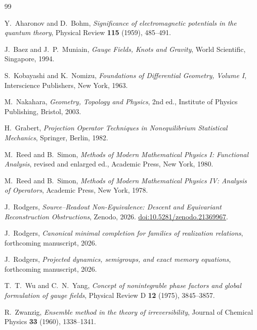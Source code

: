\documentclass[11pt,reqno]{amsart}
\theoremstyle{plain}
\theoremstyle{definition}
\begin{document}
\begin{thebibliography}{99}

Y.~Aharonov and D.~Bohm,
\emph{Significance of electromagnetic potentials in the quantum theory},
Physical Review \textbf{115} (1959), 485--491.

J.~Baez and J.~P.~Muniain,
\emph{Gauge Fields, Knots and Gravity},
World Scientific, Singapore, 1994.

S.~Kobayashi and K.~Nomizu,
\emph{Foundations of Differential Geometry, Volume I},
Interscience Publishers, New York, 1963.

M.~Nakahara,
\emph{Geometry, Topology and Physics},
2nd ed., Institute of Physics Publishing, Bristol, 2003.

H.~Grabert,
\emph{Projection Operator Techniques in Nonequilibrium Statistical Mechanics},
Springer, Berlin, 1982.

M.~Reed and B.~Simon,
\emph{Methods of Modern Mathematical Physics I: Functional Analysis},
revised and enlarged ed., Academic Press, New York, 1980.

M.~Reed and B.~Simon,
\emph{Methods of Modern Mathematical Physics IV: Analysis of Operators},
Academic Press, New York, 1978.

J.~Rodgers,
\emph{Source--Readout Non-Equivalence: Descent and Equivariant Reconstruction Obstructions},
Zenodo, 2026.
\href{https://doi.org/10.5281/zenodo.21369967}{doi:10.5281/zenodo.21369967}.

J.~Rodgers,
\emph{Canonical minimal completion for families of realization relations},
forthcoming manuscript, 2026.

J.~Rodgers,
\emph{Projected dynamics, semigroups, and exact memory equations},
forthcoming manuscript, 2026.

T.~T.~Wu and C.~N.~Yang,
\emph{Concept of nonintegrable phase factors and global formulation of gauge fields},
Physical Review D \textbf{12} (1975), 3845--3857.

R.~Zwanzig,
\emph{Ensemble method in the theory of irreversibility},
Journal of Chemical Physics \textbf{33} (1960), 1338--1341.

\end{thebibliography}
\end{document}
